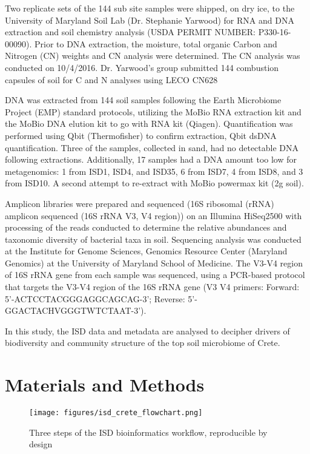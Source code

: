 Two replicate sets of the 144 sub site samples were shipped, on dry ice, to the
University of Maryland Soil Lab (Dr. Stephanie Yarwood) for RNA and DNA extraction
and soil chemistry analysis (USDA PERMIT NUMBER: P330-16-00090).
Prior to DNA extraction, the moisture, total organic Carbon and Nitrogen (CN) weights
and CN analysis were determined. The CN analysis was conducted on 10/4/2016.
Dr. Yarwood’s group submitted 144 combustion capsules of soil for C and N analyses using LECO CN628 

DNA was extracted from 144 soil samples following the Earth Microbiome Project (EMP)
standard protocols, utilizing the MoBio RNA extraction kit and the  MoBio DNA elution kit to go with RNA kit (Qiagen).
Quantification was performed using Qbit (Thermofisher) to confirm extraction, Qbit dsDNA
quantification. Three of the samples, collected in sand, had no detectable DNA
following extractions. Additionally, 17 samples had a DNA amount too low for metagenomics: 1 from ISD1, ISD4, and ISD35, 6 from ISD7, 4 from ISD8, and 3 from ISD10. A second attempt to re-extract with MoBio powermax kit (2g soil). 

Amplicon libraries were prepared and sequenced (16S ribosomal (rRNA) amplicon
sequenced (16S rRNA V3, V4 region)) on an Illumina HiSeq2500 with processing of
the reads conducted to determine the relative abundances and taxonomic diversity of bacterial taxa in soil.
Sequencing analysis was conducted at the Institute for Genome Sciences, Genomics
Resource Center (Maryland Genomics) at the University of Maryland School of Medicine.
The V3-V4 region of 16S rRNA gene from each sample was sequenced, using a
PCR-based protocol that targets the V3-V4 region of the 16S rRNA gene (V3 V4 primers: Forward: 5'-ACTCCTACGGGAGGCAGCAG-3'; Reverse: 5'-GGACTACHVGGGTWTCTAAT-3').

In this study, the ISD data and metadata are analysed to decipher drivers of 
biodiversity and community structure of the top soil microbiome of Crete. 




\section{Materials and Methods}\label{methods}

   \begin{figure}[h]
      \centering
      \texttt{[image: figures/isd\_crete\_flowchart.png]}
      \caption[Reproducible workflow of ISD analysis]{Three steps of the ISD bioinformatics workflow, reproducible by design}
      \label{fig:isd_workflow_taxonomy}
   \end{figure}
   
